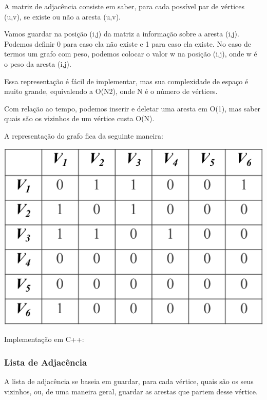 \documentclass[a4paper,12pt]{article}
\begin{document}
\indent\indent A matriz de adjacência consiste em saber, para cada possível par de vértices (u,v), se existe ou não a aresta (u,v).

\indent Vamos guardar na posição (i,j) da matriz a informação sobre a aresta (i,j). Podemos definir 0 para caso ela não existe e 1 para caso ela existe. No caso de termos um grafo com peso, podemos colocar o valor w na posição (i,j), onde w é o peso da aresta (i,j).

\indent Essa representação é fácil de implementar, mas sua complexidade de espaço é muito grande, equivalendo a O(N2), onde N é o número de vértices.

\indent Com relação ao tempo, podemos inserir e deletar uma aresta em O(1), mas saber quais são os vizinhos de um vértice custa O(N).

\indent A representação do grafo fica da seguinte maneira:

\begin{center}
  \includegraphics[width=\linewidth/2]{figures/grafos/representacao_matriz_adj.png}
\end{center}

\noindent Implementação em C++:


\subsubsection{Lista de Adjacência}

\indent\indent A lista de adjacência se baseia em guardar, para cada vértice, quais são os seus vizinhos, ou, de uma maneira geral, guardar as arestas que partem desse vértice.
\end{document}
